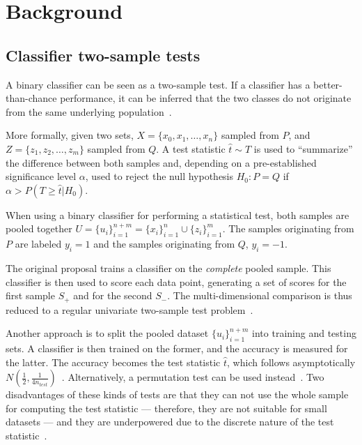 \section{Background}
\label{sec:som_background}

\subsection{Classifier two-sample tests}
\label{sec:som_classifier2sample}
A binary classifier can be seen as a two-sample test. If a classifier has a better-than-chance
performance, it can be inferred that the two classes do not originate from the same underlying
population~\cite{friedman2004multivariate}. 

More formally, given two sets, $X = \{x_0,x_1,\ldots,x_n\}$ sampled from $P$, and \linebreak
$Z = \{z_1,z_2,\ldots,z_m\}$ sampled from $Q$. A test statistic $\hat t \sim T$ is used to
``summarize'' the difference between both samples and, depending on a pre-established
significance level $\alpha$, used to reject the null hypothesis
$H_0: P = Q$ if $\alpha > P(T \ge \hat t | H_0)$.

When using a binary classifier for performing a statistical test, both samples are pooled
together $U = \{u_i\}_{i=1}^{n+m} = \{x_i\}_{i=1}^n \cup \{z_i\}_{i=1}^m$.
The samples originating from $P$ are labeled $y_i=1$ and the samples originating
from $Q$, $y_i=-1$.

The original proposal trains a classifier on the \emph{complete} pooled sample.
This classifier is then used to score each data point, generating a set of scores
for the first sample $S_+$ and for the second $S_-$. The multi-dimensional comparison
is thus reduced to a regular univariate two-sample test problem~\cite{friedman2004multivariate}.

Another approach is to split the pooled dataset $\{u_i\}_{i=1}^{n+m}$ into training
and testing sets. A classifier is then trained on the former, and the accuracy is
measured for the latter. The accuracy becomes the test statistic $\hat t$, which
follows asymptotically $N(\frac{1}{2}, \frac{1}{4 n_{test}})$~\cite{lopez2016revisiting}.
Alternatively, a permutation test can be used  instead~\cite{kim2021classification}.
Two disadvantages of these kinds of tests are that they can not use the whole sample
for computing the test statistic --- therefore, they are not suitable for small
datasets --- and they are underpowered due to the discrete nature of the test
statistic~\cite{rosenblatt2021better}.

